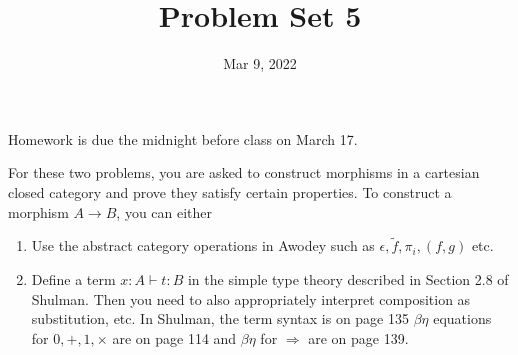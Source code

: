 \documentclass[12pt]{article}
\begin{document}
\newcommand{\skipp}{\textrm{skip}}
\newcommand{\boxprod}{\mathop{\square}}
\newcommand{\Set}{\textrm{Set}}
\newcommand{\Cat}{\textrm{Cat}}
\newcommand{\Cayley}{\textrm{Cayley}}
\newcommand{\Preds}{\mathcal{P}}
\newcommand{\triple}[3]{\{#1\}{#2}\{#3\}}
\newcommand{\Triple}{\textrm{Triple}}
\newcommand{\Analyse}{\textrm{Analyse}}
\newcommand{\command}{\textrm{command}}

\newcommand{\id}{\textrm{id}}

\newcommand{\isatype}{\,\,\textrm{type}}
\newcommand{\matchZero}{\textrm{match}_0}
\newcommand{\matchSum}[3]{\textrm{match}_+ {#1}\{{#2}\}\{{#3}\}}

\title{Problem Set 5}
\date{Mar 9, 2022}
\maketitle

Homework is due the midnight before class on March 17.

For these two problems, you are asked to construct morphisms in a
cartesian closed category and prove they satisfy certain
properties. To construct a morphism $A \to B$, you can either
\begin{enumerate}
\item Use the abstract category operations in Awodey such as
  $\epsilon, \tilde f, \pi_i, (f,g)$ etc.
\item Define a term $x : A \vdash t : B$ in the simple type theory
  described in Section 2.8 of Shulman. Then you need to also
  appropriately interpret composition as substitution, etc. In
  Shulman, the term syntax is on page 135 $\beta\eta$ equations for
  $0,+,1,\times$ are on page 114 and $\beta\eta$ for $\Rightarrow$ are
  on page 139.
\end{enumerate}
\end{document}
